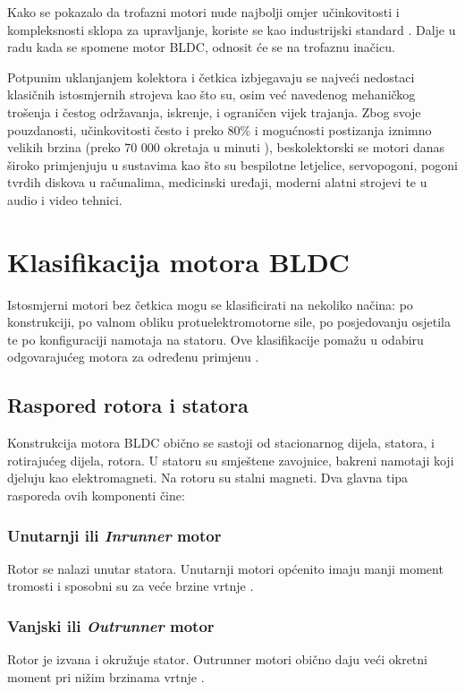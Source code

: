 \documentclass[diplomskirad]{fer}
\begin{document}
Kako se pokazalo da trofazni motori nude najbolji omjer učinkovitosti i
kompleksnosti sklopa za upravljanje, koriste se kao industrijski standard
\cite{cite:trofazni}. Dalje u radu kada se spomene motor BLDC, odnosit će se na
trofaznu inačicu.

Potpunim uklanjanjem kolektora i četkica izbjegavaju se najveći nedostaci
klasičnih istosmjernih strojeva kao što su, osim već navedenog mehaničkog
trošenja i čestog održavanja, iskrenje, i ograničen vijek trajanja. Zbog svoje
pouzdanosti, učinkovitosti često i preko 80\% \cite{motor-ucinkovitost} i
mogućnosti postizanja iznimno velikih brzina (preko 70 000 okretaja u minuti
\cite{motor-rpm}), beskolektorski se motori danas široko primjenjuju u
sustavima kao što su bespilotne letjelice, servopogoni, pogoni tvrdih diskova u
računalima, medicinski uređaji, moderni alatni strojevi te u audio i video
tehnici.

\newpage
\section{Klasifikacija motora BLDC}
Istosmjerni motori bez četkica mogu se klasificirati na nekoliko načina: po
konstrukciji, po valnom obliku protuelektromotorne sile, po posjedovanju
osjetila te po konfiguraciji namotaja na statoru. Ove klasifikacije pomažu u
odabiru odgovarajućeg motora za određenu primjenu \cite{cite:bldc}.

\subsection{Raspored rotora i statora}
Konstrukcija motora BLDC obično se sastoji od stacionarnog dijela, statora, i
rotirajućeg dijela, rotora. U statoru su smještene zavojnice, bakreni namotaji
koji djeluju kao elektromagneti. Na rotoru su stalni magneti. Dva glavna tipa
rasporeda ovih komponenti čine:
\subsubsection{Unutarnji ili \textit{ Inrunner } motor} Rotor se nalazi unutar statora. Unutarnji motori općenito imaju manji
moment tromosti i sposobni su za veće brzine vrtnje \cite{cite:bldc}.
\subsubsection{Vanjski ili \textit{ Outrunner } motor} Rotor je izvana i okružuje stator. Outrunner motori obično daju veći
okretni moment pri nižim brzinama vrtnje \cite{cite:bldc}.
\end{document}
